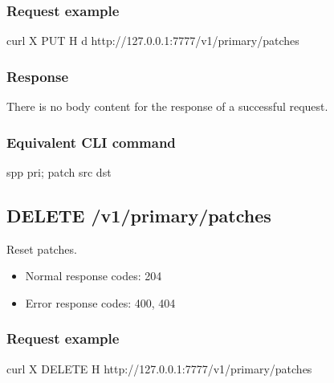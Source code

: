 \documentclass[a4paper,11pt,openany,oneside,english]{sphinxmanual}
\begin{document}
\subsubsection{Request example}
\label{\detokenize{api_ref/spp_primary:id9}}
\begin{sphinxVerbatim}[commandchars=\\\{\},formatcom=\footnotesize]
 curl \PYGZhy{}X PUT \PYGZhy{}H  
  \PYGZhy{}d  
  http://127.0.0.1:7777/v1/primary/patches
\end{sphinxVerbatim}


\subsubsection{Response}
\label{\detokenize{api_ref/spp_primary:id10}}
There is no body content for the response of a successful  request.


\subsubsection{Equivalent CLI command}
\label{\detokenize{api_ref/spp_primary:id11}}
\begin{sphinxVerbatim}[commandchars=\\\{\},formatcom=\footnotesize]
spp \PYGZgt{} pri; patch \PYGZob{}src\PYGZcb{} \PYGZob{}dst\PYGZcb{}
\end{sphinxVerbatim}


\subsection{DELETE /v1/primary/patches}
\label{\detokenize{api_ref/spp_primary:delete-v1-primary-patches}}
Reset patches.
\begin{itemize}
\item {} 
Normal response codes: 204

\item {} 
Error response codes: 400, 404

\end{itemize}


\subsubsection{Request example}
\label{\detokenize{api_ref/spp_primary:id12}}
\begin{sphinxVerbatim}[commandchars=\\\{\},formatcom=\footnotesize]
 curl \PYGZhy{}X DELETE \PYGZhy{}H  
  http://127.0.0.1:7777/v1/primary/patches
\end{sphinxVerbatim}
\end{document}
